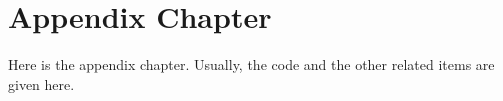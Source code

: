 \chapter{Appendix Chapter}

Here is the appendix chapter. Usually, the code  and the other related items are given here. 